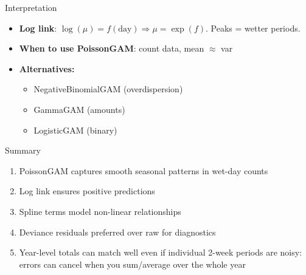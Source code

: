 \documentclass{beamer}
\begin{document}
\begin{frame}{Interpretation}
  \begin{itemize}
    \item \textbf{Log link}: $\log(\mu) = f(\mathrm{day}) \Rightarrow \mu = \exp(f)$. Peaks = wetter periods.
    \item \textbf{When to use PoissonGAM}: count data, mean $\approx$ var
    \item \textbf{Alternatives:}
    \begin{itemize}
      \item NegativeBinomialGAM (overdispersion)
      \item GammaGAM (amounts)
      \item LogisticGAM (binary)
    \end{itemize}
  \end{itemize}
\end{frame}

\begin{frame}{Summary}
  \begin{enumerate}
    \item PoissonGAM captures smooth seasonal patterns in wet-day counts
    \item Log link ensures positive predictions
    \item Spline terms model non-linear relationships
    \item Deviance residuals preferred over raw for diagnostics
    \item Year-level totals can match well even if individual 2-week periods are noisy: errors can cancel when you sum/average over the whole year
  \end{enumerate}
\end{frame}
\end{document}
